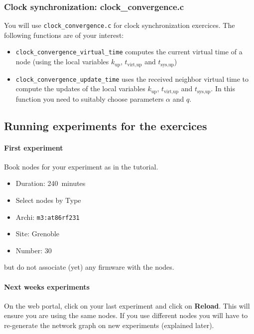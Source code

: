 \documentclass{article}
\begin{document}
\subsubsection{Clock synchronization: clock\_convergence.c}

You will use \verb=clock_convergence.c= for clock synchronization exercices.
The following functions are of your interest:

\begin{itemize}
	\item \verb=clock_convergence_virtual_time= computes the current virtual time of a node
        (using the local variables $k_{\text{up}}$, $t_{\text{virt},\text{up}}$ and $t_{\text{sys},\text{up}}$)
	\item \verb=clock_convergence_update_time= uses the received neighbor virtual time
        to compute the updates of the local variables
        $k_{\text{up}}$, $t_{\text{virt},\text{up}}$ and $t_{\text{sys},\text{up}}$.
        In this function you need to suitably choose parameters $\alpha$ and $q$.
\end{itemize}

\subsection{Running experiments for the exercices}

\paragraph{First experiment} Book nodes for your experiment as in the tutorial.
\begin{itemize}
\item Duration: 240~minutes
\item Select nodes by Type
\item Archi: \texttt{m3:at86rf231}
\item Site: Grenoble
\item Number: $30$
\end{itemize}
but do not associate (yet) any firmware with the nodes.

\paragraph{Next weeks experiments} On the web portal, click on your last
experiment and click on \textbf{Reload}. This will ensure you are using the
same nodes. If you use different nodes you will have to re-generate the network
graph on new experiments (explained later).
\end{document}

